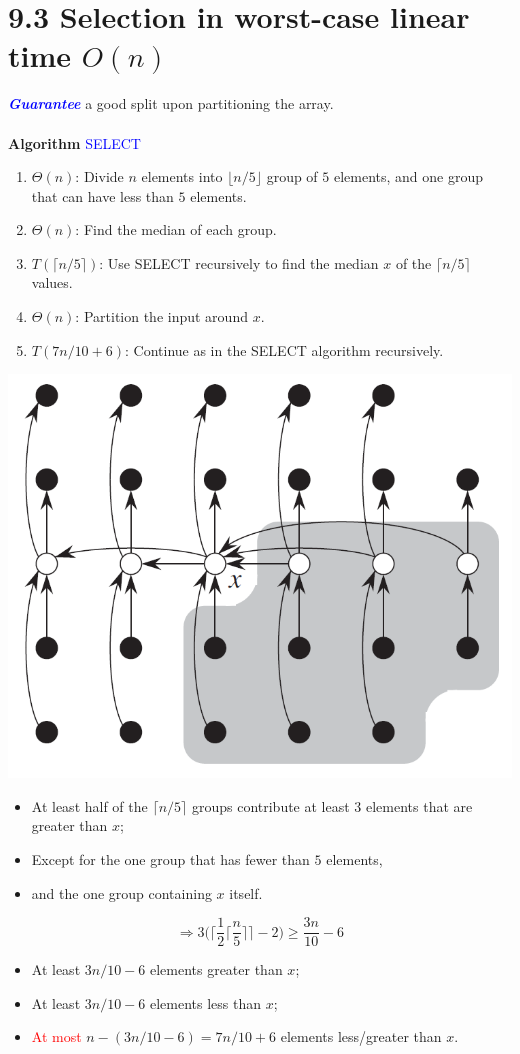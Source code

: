 \documentclass[a4paper]{article}
\begin{document}
\section*{9.3 Selection in worst-case linear time $O(n)$}
\textcolor{blue}{\textit{\textbf{Guarantee}}} a good split upon partitioning the array.\\
\\
\textbf{Algorithm} \textcolor{blue}{SELECT}
\begin{enumerate}
    \item $\Theta(n)$: Divide $n$ elements into $\lfloor n/5 \rfloor$ group of $5$ elements, and one group that can have less than $5$ elements.
    \item $\Theta(n)$: Find the median of each group.
    \item $T(\lceil n/5 \rceil)$: Use SELECT recursively to find the median $x$ of the $\lceil n/5 \rceil$ values.
    \item $\Theta(n)$: Partition the input around $x$.
    \item $T(7n/10+6)$: Continue as in the SELECT algorithm recursively.
\end{enumerate}
\includegraphics[scale=0.5]{"algorithm SELECT"}
\begin{itemize}
    \item At least half of the $\lceil n/5\rceil$ groups contribute at least $3$ elements that are greater than $x$;
    \item Except for the one group that has fewer than $5$ elements,
    \item and the one group containing $x$ itself.
\end{itemize}
\begin{equation*}
    \Rightarrow 3\Bigg(\bigg\lceil\frac{1}{2}\Big\lceil\frac{n}{5}\Big\rceil\bigg\rceil-2\Bigg)\geq \frac{3n}{10}-6
\end{equation*}
\begin{itemize}
    \item At least $3n/10-6$ elements greater than $x$;
    \item At least $3n/10-6$ elements less than $x$;
    \item \textcolor{red}{At most} $n-(3n/10-6)=7n/10+6$ elements less/greater than $x$.
\end{itemize}
\end{document}
